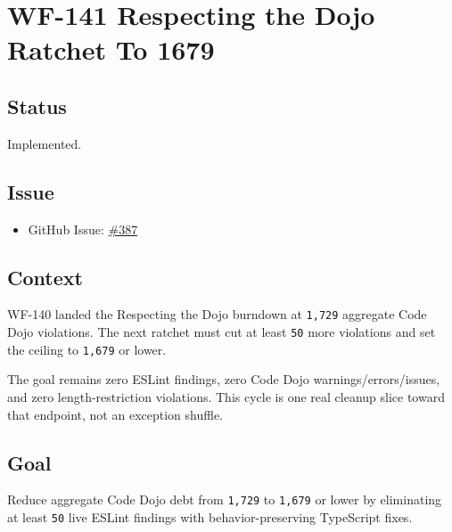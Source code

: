 \chapter{WF-141 Respecting the Dojo Ratchet To 1679}\label{record-223}

\smallskip

\section{Status}\label{record-223-status}

Implemented.

\section{Issue}\label{record-223-issue}

\begin{itemize}
\tightlist
\item
  GitHub Issue: \href{https://github.com/flyingrobots/bijou/issues/387}{\#387}
\end{itemize}

\section{Context}\label{record-223-context}

WF-140 landed the Respecting the Dojo burndown at \texttt{1\allowbreak{},\allowbreak{}7\allowbreak{}2\allowbreak{}9} aggregate Code Dojo violations. The next ratchet must cut at least \texttt{5\allowbreak{}0} more violations and set the ceiling to \texttt{1\allowbreak{},\allowbreak{}6\allowbreak{}7\allowbreak{}9} or lower.

The goal remains zero ESLint findings, zero Code Dojo warnings/errors/issues, and zero length-restriction violations. This cycle is one real cleanup slice toward that endpoint, not an exception shuffle.

\section{Goal}\label{record-223-goal}

Reduce aggregate Code Dojo debt from \texttt{1\allowbreak{},\allowbreak{}7\allowbreak{}2\allowbreak{}9} to \texttt{1\allowbreak{},\allowbreak{}6\allowbreak{}7\allowbreak{}9} or lower by eliminating at least \texttt{5\allowbreak{}0} live ESLint findings with behavior-preserving TypeScript fixes.

